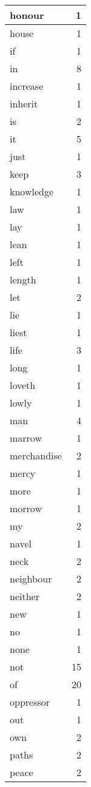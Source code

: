 \begin{center}
\begin{longtable}{l|r}
honour & 1\\ \hline 
house & 1\\ \hline 
if & 1\\ \hline 
in & 8\\ \hline 
increase & 1\\ \hline 
inherit & 1\\ \hline 
is & 2\\ \hline 
it & 5\\ \hline 
just & 1\\ \hline 
keep & 3\\ \hline 
knowledge & 1\\ \hline 
law & 1\\ \hline 
lay & 1\\ \hline 
lean & 1\\ \hline 
left & 1\\ \hline 
length & 1\\ \hline 
let & 2\\ \hline 
lie & 1\\ \hline 
liest & 1\\ \hline 
life & 3\\ \hline 
long & 1\\ \hline 
loveth & 1\\ \hline 
lowly & 1\\ \hline 
man & 4\\ \hline 
marrow & 1\\ \hline 
merchandise & 2\\ \hline 
mercy & 1\\ \hline 
more & 1\\ \hline 
morrow & 1\\ \hline 
my & 2\\ \hline 
navel & 1\\ \hline 
neck & 2\\ \hline 
neighbour & 2\\ \hline 
neither & 2\\ \hline 
new & 1\\ \hline 
no & 1\\ \hline 
none & 1\\ \hline 
not & 15\\ \hline 
of & 20\\ \hline 
oppressor & 1\\ \hline 
out & 1\\ \hline 
own & 2\\ \hline 
paths & 2\\ \hline 
peace & 2\\ \hline 

\end{longtable}
\end{center}
